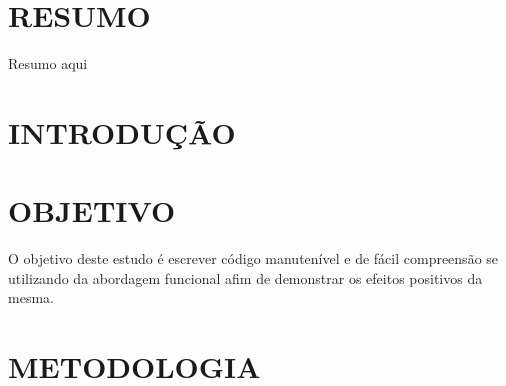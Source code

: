 \documentclass[date,twocolumn,a4paper]{ppgem}
\begin{document}
    \thispagestyle{plain}
    \makeheader
    \renewcommand{\listingscaption}{Código}


    \section*{RESUMO}
    Resumo aqui

    \section{INTRODUÇÃO}


    \section{OBJETIVO}
    O objetivo deste estudo é escrever código manutenível e de fácil compreensão se utilizando da abordagem funcional
    afim de demonstrar os efeitos positivos da mesma.

    \section{METODOLOGIA}
\end{document}
